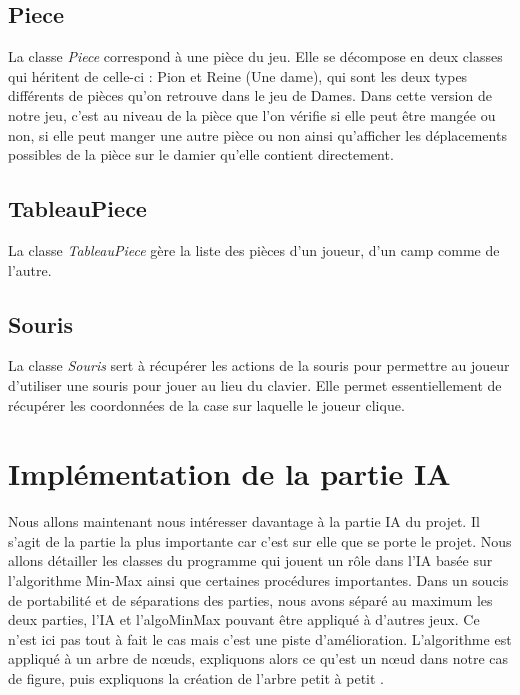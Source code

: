 \documentclass[12,french]{report}
\begin{document}
\subsection{Piece}

La classe \textit{Piece} correspond à une pièce du jeu. Elle se décompose en deux classes qui héritent de celle-ci : Pion et Reine (Une dame), qui sont les deux types différents de pièces qu'on retrouve dans le jeu de Dames. Dans cette version de notre jeu, c'est au niveau de la pièce que l'on vérifie si elle peut être mangée ou non, si elle peut manger une autre pièce ou non ainsi qu'afficher les déplacements possibles de la pièce sur le damier qu'elle contient directement.

\subsection{TableauPiece}

La classe \textit{TableauPiece} gère la liste des pièces d'un joueur, d'un camp comme de l'autre.

\subsection{Souris}

La classe \textit{Souris} sert à récupérer les actions de la souris pour permettre au joueur d'utiliser une souris pour jouer au lieu du clavier. Elle permet essentiellement de récupérer les coordonnées de la case sur laquelle le joueur clique. 


\section{Implémentation de la partie IA}

Nous allons maintenant nous intéresser davantage à la partie IA du projet. Il s'agit de la partie la plus importante car c'est sur elle que se porte le projet.  Nous allons détailler les classes du programme qui jouent un rôle dans l'IA basée sur l'algorithme Min-Max ainsi que certaines procédures importantes.
Dans un soucis de portabilité et de séparations des parties, nous avons séparé au maximum les deux parties, l'IA et l'algoMinMax pouvant être appliqué à d'autres jeux. Ce n'est ici pas tout à fait le cas mais c'est une piste d'amélioration.
 L'algorithme est appliqué à un arbre de nœuds, expliquons alors ce qu'est un nœud dans notre cas de figure, puis expliquons la création de l'arbre petit à petit .
\end{document}
